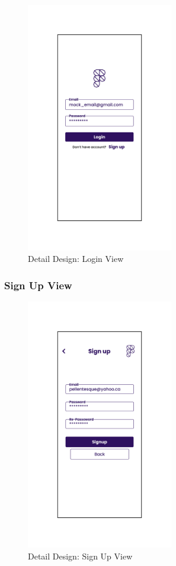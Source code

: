 \documentclass[../thesis.tex]{subfiles}
\begin{document}
\begin{figure}[H]
    \centering
    \includegraphics[width=0.57\textwidth]{images/DetailedDesign_LoginView.png}
    \caption{Detail Design: Login View}
    \label{fig:DetailedDesign_LoginView}
\end{figure}

\subsubsection{Sign Up View}
\begin{figure}[H]
    \centering
    \includegraphics[width=0.57\textwidth]{images/DetailedDesign_SignUp.png}
    \caption{Detail Design: Sign Up View}
    \label{fig:DetailedDesign_SignUp}
\end{figure}
\end{document}
